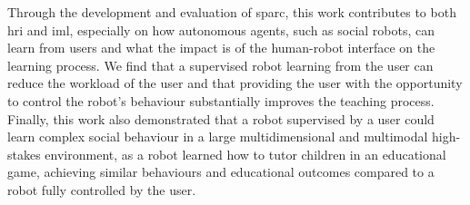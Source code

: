 Through the development and evaluation of \gls{sparc}, this work contributes to both \gls{hri} and \acrlong{iml}, especially on how autonomous agents, such as social robots, can learn from users and what the impact is of the human-robot interface on the learning process. We find that a supervised robot learning from the user can reduce the workload of the user and that providing the user with the opportunity to control the robot's behaviour substantially improves the teaching process. Finally, this work also demonstrated that a robot supervised by a user could learn complex social behaviour in a large multidimensional and multimodal high-stakes environment, as a robot learned how to tutor children in an educational game, achieving similar behaviours and educational outcomes compared to a robot fully controlled by the user. 

